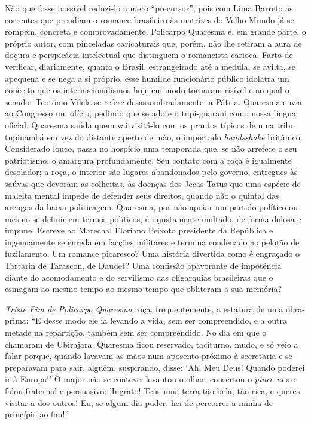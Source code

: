 \documentclass[
  letterpaper,
  DIV=11,
  numbers=noendperiod]{scrreprt}
\begin{document}
Não que fosse possível reduzi-lo a mero ``precursor'', pois com Lima
Barreto as correntes que prendiam o romance brasileiro às matrizes do
Velho Mundo já se rompem, concreta e comprovadamente. Policarpo Quaresma
é, em grande parte, o próprio autor, com pinceladas caricaturais que,
porém, não lhe retiram a aura de doçura e perspicácia intelectual que
distinguem o romancista carioca. Farto de verificar, diariamente, quanto
o Brasil, estrangeirado até a medula, se avilta, se apequena e se nega a
si próprio, esse humilde funcionário público idolatra um conceito que os
internacionalismos hoje em modo tornaram risível e ao qual o senador
Teotônio Vilela se refere desassombradamente: a Pátria. Quaresma envia
ao Congresso um ofício, pedindo que se adote o tupi-guarani como nossa
língua oficial. Quaresma saúda quem vai visitá-lo com os prantos típicos
de uma tribo tupinambá em vez do distante aperto de mão, o importado
\emph{handsshake} britânico. Considerado louco, passa no hospício uma
temporada que, se não arrefece o seu patriotismo, o amargura
profundamente. Seu contato com a roça é igualmente desolador; a roça, o
interior são lugares abandonados pelo governo, entregues às saúvas que
devoram as colheitas, às doenças dos Jecas-Tatus que uma espécie de
maleita mental impede de defender seus direitos, quando não o quintal
das arengas da baixa politicagem. Quaresma, por não apoiar um partido
político ou mesmo se definir em termos políticos, é injustamente
multado, de forma dolosa e impune. Escreve ao Marechal Floriano Peixoto
presidente da República e ingenuamente se enreda em facções militares e
termina condenado ao pelotão de fuzilamento. Um romance picaresco? Uma
história divertida como é engraçado o Tartarin de Tarascon, de Daudet?
Uma confissão apavorante de impotência diante do acomodamento e do
servilismo das oligarquias brasileiras que o esmagam ao mesmo tempo ao
mesmo tempo que obliteram a sua memória?

\emph{Triste Fim de Policarpo Quaresma} roça, frequentemente, a estatura
de uma obra-prima: ``E desse modo ele ia levando a vida, sem ser
compreendido, e a outra metade na repartição, também sem ser
compreendido. No dia em que o chamaram de Ubirajara, Quaresma ficou
reservado, taciturno, mudo, e só veio a falar porque, quando lavavam as
mãos num aposento próximo à secretaria e se preparavam para sair,
alguém, suspirando, disse: `Ah! Meu Deus! Quando poderei ir à Europa!' O
major não se conteve: levantou o olhar, consertou o \emph{pince-nez} e
falou fraternal e persuasivo: 'Ingrato! Tens uma terra tão bela, tão
rica, e queres visitar a dos outros! Eu, se algum dia puder, hei de
percorrer a minha de princípio ao fim!''
\end{document}
